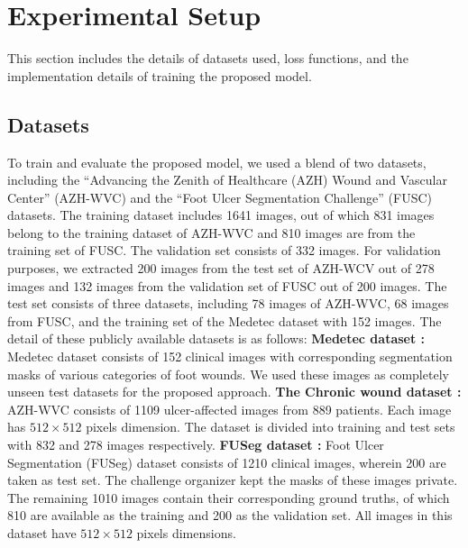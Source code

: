 \documentclass[review]{elsarticle}
\begin{document}
\section{Experimental Setup}
This section includes the details of datasets used, loss functions, and the implementation details of training the proposed model.
\subsection{Datasets}
To train and evaluate the proposed model, we used a blend of two datasets, including the \enquote{Advancing the Zenith of Healthcare (AZH) Wound and Vascular Center} (AZH-WVC) \cite{wang2020fully} and the \enquote{Foot Ulcer Segmentation Challenge} (FUSC) \cite{wang2022fuseg} datasets. The training dataset includes 1641 images, out of which 831 images belong to the training dataset of AZH-WVC and 810 images are from the training set of FUSC. The validation set consists of 332 images. For validation purposes, we extracted 200 images from the test set of AZH-WCV out of 278 images and 132 images from the validation set of FUSC out of 200 images. The test set consists of three datasets, including 78 images of AZH-WVC, 68 images from FUSC, and the training set of the Medetec dataset \cite{thomas_2014} with 152 images. The detail of these publicly available datasets is as follows:
 \newline\textbf{Medetec dataset \cite{thomas_2014}:} Medetec dataset consists of 152 clinical images with corresponding segmentation masks of various categories of foot wounds. We used these images as completely unseen test datasets for the proposed approach.
\newline\textbf{The Chronic wound dataset \cite{wang2020fully}:} AZH-WVC consists of 1109 ulcer-affected images from 889 patients. Each image has $512\times512$ pixels dimension. The dataset is divided into training and test sets with 832 and 278 images respectively.
\newline\textbf{FUSeg dataset \cite{wang2022fuseg}:} Foot Ulcer Segmentation (FUSeg) dataset consists of 1210 clinical images, wherein 200 are taken as test set. The challenge organizer kept the masks of these images private. The remaining 1010 images contain their corresponding ground truths, of which 810 are available as the training and 200 as the validation set. All images in this dataset have $512\times512$ pixels dimensions.
\end{document}
